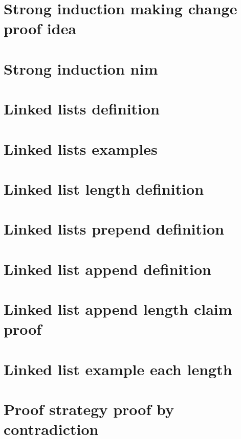 \section*{Strong induction making change proof idea}

\vfill
\section*{Strong induction nim}

\vfill
\section*{Linked lists definition}

\vfill
\section*{Linked lists examples}

\vfill
\section*{Linked list length definition}

\vfill
\section*{Linked lists prepend definition}

\vfill
\section*{Linked list append definition}

\vfill
\section*{Linked list append length claim proof}

\vfill
\section*{Linked list example each length}

\vfill
\section*{Proof strategy proof by contradiction}

\vfill
